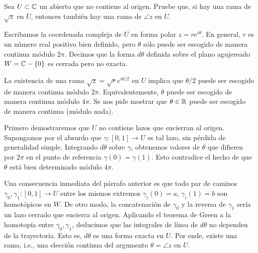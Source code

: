 \begin{exercise}
Sea $U \subset \mathbb C$ un abierto que no contiene al origen. Pruebe que, si hay una rama de $\sqrt z$ en $U$, entonces también hay una rama de $\angle z$ en $U$.
\end{exercise}

\begin{solution}
Escribamos la coordenada compleja de $U$ en forma polar $z = re^{i\theta}$. En general, $r$ es un número real positivo bien definido, pero $\theta$ sólo puede ser escogido de manera continua módulo $2\pi$. Decimos que la forma $d\theta$ definida sobre el plano agujereado $W = \mathbb C - \{ 0 \}$ es cerrada pero no exacta.

La existencia de una rama $\sqrt z = \sqrt re^{i\theta/2}$ en $U$ implica que $\theta/2$ puede ser escogido de manera continua módulo $2\pi$. Equivalentemente, $\theta$ puede ser escogido de manera continua módulo $4\pi$. Se nos pide mostrar que $\theta \in \mathbb R$ puede ser escogido de manera continua (módulo nada).

Primero demostraremos que $U$ no contiene lazos que encierran al origen. Supongamos por el absurdo que $\gamma : [0,1] \to U$ es tal lazo, sin pérdida de generalidad simple. Integrando $d\theta$ sobre $\gamma$, obtenemos valores de $\theta$ que difieren por $2\pi$ en el punto de referencia $\gamma(0) = \gamma(1)$. Esto contradice el hecho de que $\theta$ está bien determinado módulo $4\pi$.

Una consecuencia inmediata del párrafo anterior es que todo par de caminos $\gamma_0, \gamma_1 : [0,1] \to U$ entre los mismos extremos $\gamma_i(0) = a$, $\gamma_i(1) = b$ son homotópicos en $W$. De otro modo, la concatenación de $\gamma_0$ y la reversa de $\gamma_1$ sería un lazo cerrado que encierra al origen. Aplicando el teorema de Green a la homotopía entre $\gamma_0, \gamma_1$, deducimos que las integrales de línea de $d\theta$ no dependen de la trayectoria. Esto es, $d\theta$ es una forma exacta en $U$. Por ende, existe una rama, i.e., una elección continua del argumento $\theta = \angle z$ en $U$.
\end{solution}

